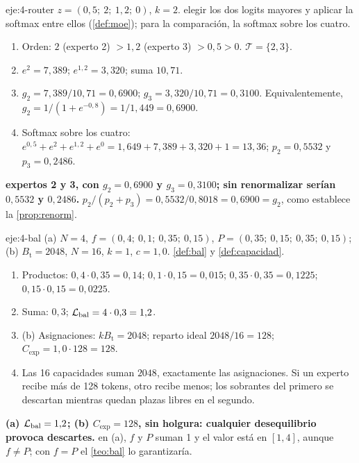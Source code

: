 \begin{solucion}{eje:4-router}
\datos $z=(0{,}5;\ 2;\ 1{,}2;\ 0)$, $k=2$.
\planteamiento elegir los dos logits mayores y aplicar la softmax entre ellos (\cref{def:moe}); para la comparación, la softmax sobre los cuatro.
\pasos
\begin{enumerate}[label=\arabic*.]
  \item Orden: $2$ (experto 2) $>1{,}2$ (experto 3) $>0{,}5>0$. $\mathcal T=\{2,3\}$.
  \item $e^{2}=7{,}389$; $e^{1{,}2}=3{,}320$; suma $10{,}71$.
  \item $g_2=7{,}389/10{,}71=0{,}6900$; $g_3=3{,}320/10{,}71=0{,}3100$. Equivalentemente, $g_2=1/(1+e^{-0{,}8})=1/1{,}449=0{,}6900$.
  \item Softmax sobre los cuatro: $e^{0{,}5}+e^{2}+e^{1{,}2}+e^{0}=1{,}649+7{,}389+3{,}320+1=13{,}36$; $p_2=0{,}5532$ y $p_3=0{,}2486$.
\end{enumerate}
\resultado \textbf{expertos 2 y 3, con $g_2=0{,}6900$ y $g_3=0{,}3100$; sin renormalizar serían $0{,}5532$ y $0{,}2486$.}
\comprobacion $p_2/(p_2+p_3)=0{,}5532/0{,}8018=0{,}6900=g_2$, como establece la \cref{prop:renorm}.
\end{solucion}

\begin{solucion}{eje:4-bal}
\datos (a) $N=4$, $f=(0{,}4;\ 0{,}1;\ 0{,}35;\ 0{,}15)$, $P=(0{,}35;\ 0{,}15;\ 0{,}35;\ 0{,}15)$; (b) $B_{\mathrm{t}}=2048$, $N=16$, $k=1$, $c=1{,}0$.
\planteamiento \cref{def:bal} y \cref{def:capacidad}.
\pasos
\begin{enumerate}[label=\arabic*.]
  \item Productos: $0{,}4\cdot 0{,}35=0{,}14$; $0{,}1\cdot 0{,}15=0{,}015$; $0{,}35\cdot 0{,}35=0{,}1225$; $0{,}15\cdot 0{,}15=0{,}0225$.
  \item Suma: $0{,}3$; $\mathcal{L}_{\mathrm{bal}}=4\cdot 0{,}3=1{,}2$.
  \item (b) Asignaciones: $kB_{\mathrm{t}}=2048$; reparto ideal $2048/16=128$; $C_{\mathrm{exp}}=1{,}0\cdot 128=128$.
  \item Las 16 capacidades suman $2048$, exactamente las asignaciones. Si un experto recibe más de 128 tokens, otro recibe menos; los sobrantes del primero se descartan mientras quedan plazas libres en el segundo.
\end{enumerate}
\resultado \textbf{(a) $\mathcal{L}_{\mathrm{bal}}=1{,}2$; (b) $C_{\mathrm{exp}}=128$, sin holgura: cualquier desequilibrio provoca descartes.}
\comprobacion en (a), $f$ y $P$ suman 1 y el valor está en $[1,4]$, aunque $f\ne P$; con $f=P$ el \cref{teo:bal} lo garantizaría.
\end{solucion}

